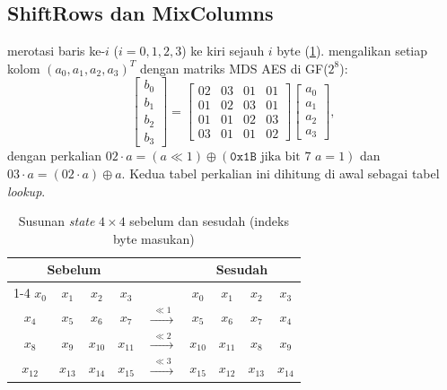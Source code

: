 \subsection{ShiftRows dan MixColumns}
 merotasi baris ke-$i$ ($i = 0,1,2,3$) ke kiri sejauh $i$ byte (\cref{tab:shiftrows}).  mengalikan setiap kolom $(a_0, a_1, a_2, a_3)^T$ dengan matriks MDS AES di GF($2^8$):
\begin{equation}
    \begin{bmatrix} b_0 \\ b_1 \\ b_2 \\ b_3 \end{bmatrix} =
    \begin{bmatrix} 02 & 03 & 01 & 01 \\ 01 & 02 & 03 & 01 \\ 01 & 01 & 02 & 03 \\ 03 & 01 & 01 & 02 \end{bmatrix}
    \begin{bmatrix} a_0 \\ a_1 \\ a_2 \\ a_3 \end{bmatrix},
\end{equation}
dengan perkalian $02 \cdot a = (a \ll 1) \oplus (\texttt{0x1B} \text{ jika bit 7 } a = 1)$ dan $03 \cdot a = (02 \cdot a) \oplus a$. Kedua tabel perkalian ini dihitung di awal sebagai tabel \textit{lookup}.

\begin{table}[H]
    \centering
    \caption{Susunan \textit{state} $4\times4$ sebelum dan sesudah  (indeks byte masukan)}
    \label{tab:shiftrows}
    \begin{tabular}{cccc c cccc}
        \multicolumn{4}{c}{\textbf{Sebelum}} & \quad & \multicolumn{4}{c}{\textbf{Sesudah}} \\
        \cmidrule{1-4} \cmidrule{6-9}
        $x_0$ & $x_1$ & $x_2$ & $x_3$ & & $x_0$ & $x_1$ & $x_2$ & $x_3$ \\
        $x_4$ & $x_5$ & $x_6$ & $x_7$ & $\xrightarrow{\;\ll 1\;}$ & $x_5$ & $x_6$ & $x_7$ & $x_4$ \\
        $x_8$ & $x_9$ & $x_{10}$ & $x_{11}$ & $\xrightarrow{\;\ll 2\;}$ & $x_{10}$ & $x_{11}$ & $x_8$ & $x_9$ \\
        $x_{12}$ & $x_{13}$ & $x_{14}$ & $x_{15}$ & $\xrightarrow{\;\ll 3\;}$ & $x_{15}$ & $x_{12}$ & $x_{13}$ & $x_{14}$ \\
    \end{tabular}
\end{table}

